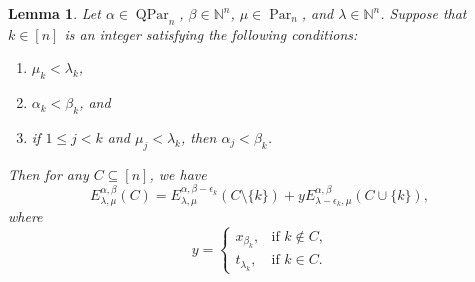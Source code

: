 \documentclass[12pt]{amsart}
\numberwithin{equation}{section}
\newtheorem{lem}[thm]{Lemma}
\theoremstyle{definition}
\newcommand\NN{\mathbb{N}}
\newcommand\Par{\operatorname{Par}}
\newcommand\QPar{\operatorname{QPar}}
\begin{document}
\begin{lem}\label{lem:rec e}
  Let $\alpha\in\QPar_n$, $\beta\in\NN^n$, $\mu\in\Par_n$, and
  $\lambda\in\NN^n$. Suppose that $k\in[n]$ is an integer satisfying the
  following conditions:
  \begin{enumerate}
  \item $\mu_k<\lambda_k$,
  \item $\alpha_k<\beta_k$, and
  \item if $1\le j<k$ and $\mu_j<\lambda_k$, then $\alpha_j<\beta_k$.
  \end{enumerate}
   Then for any $C\subseteq[n]$, we have
\[
  E_{\lambda,\mu}^{\alpha,\beta}(C)
  =E_{\lambda,\mu}^{\alpha,\beta-\epsilon_k}(C\setminus\{k\})
  +y E_{\lambda-\epsilon_k,\mu}^{\alpha,\beta}(C\cup\{k\}),
\]
where
\[
y =
\begin{cases}
  x_{\beta_k}, &\mbox{if $k\not\in C$,}\\
  t_{\lambda_k}, &\mbox{if $k\in C$.}
\end{cases}
\]
\end{lem}
\end{document}
